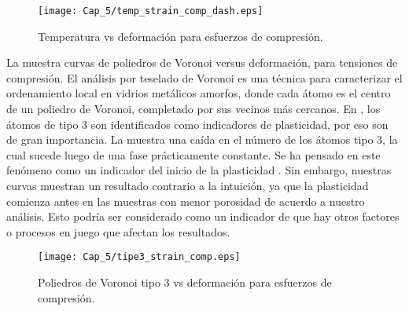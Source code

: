 \begin{figure}[H]
  \centering
	\texttt{[image: Cap\_5/temp\_strain\_comp\_dash.eps]}
	\caption[Temperatura vs deformación para esfuerzos de compresión]{Temperatura vs deformación para esfuerzos de compresión.}
	\label{C5:fg:tempComp}
\end{figure}

La  muestra curvas de poliedros de Voronoi versus deformación, para tensiones de compresión. El análisis por teselado de Voronoi es una técnica para caracterizar el ordenamiento local en vidrios metálicos amorfos, donde cada átomo es el centro de un poliedro de Voronoi,
completado por sus vecinos más cercanos. En \cite{arman10}, los átomos de tipo 3 son identificados como indicadores de plasticidad, por eso
son de gran importancia. La  muestra una caída en el número de los átomos tipo 3, la cual sucede luego de una fase prácticamente constante. Se ha pensado en este fenómeno como un indicador del inicio de la plasticidad \citep{arman10}. Sin embargo, nuestras curvas muestran un resultado contrario a la intuición, ya que la plasticidad comienza antes en las muestras con menor porosidad de acuerdo a nuestro análisis. Esto podría ser considerado como un indicador de que hay otros factores o procesos en juego que afectan los resultados.

\begin{figure}[H]
  \centering
	\texttt{[image: Cap\_5/tipe3\_strain\_comp.eps]}
	\caption[Poliedros de Voronoi tipo 3 vs deformación para esfuerzos de compresión]{Poliedros de Voronoi tipo 3 vs deformación para esfuerzos de compresión.}
	\label{C5:fg:tip3Comp}
\end{figure}

